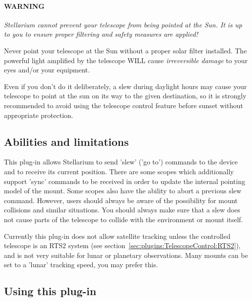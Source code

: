 \paragraph{WARNING}\emph{Stellarium cannot prevent your
telescope from being pointed at the Sun. It is up to you to ensure
proper filtering and safety measures are applied!}

Never point your telescope at the Sun without a proper solar filter
installed. The powerful light amplified by the telescope WILL cause
\emph{irreversible damage} to your eyes and/or your equipment.

Even if you don't do it deliberately, a slew during daylight hours may
cause your telescope to point at the sun on its way to the given
destination, so it is strongly recommended to avoid using the
telescope control feature before sunset without appropriate
protection.



\subsection{Abilities and limitations}
\label{sec:plugins:TelescopeControl:Limitations}

This plug-in allows Stellarium to send 'slew' ('go to') commands
to the device and to receive its current position. There are some scopes which
additionally support 'sync' commands to be received in order to update the internal
pointing model of the mount. Some scopes also have the ability to abort a previous 
slew command. However, users should always be aware of the possibility for mount 
collisions and similar situations. You should always make sure that a slew does 
not cause parts of the telescope to collide with the environment or mount itself. 

Currently this plug-in does not allow satellite tracking unless the controlled 
telescope is an RTS2 system (see section~\ref{sec:plugins:TelescopeControl:RTS2}), 
and is not very suitable for lunar or planetary observations. 
Many mounts can be set to a 'lunar' tracking speed, you may prefer this. 

\subsection{Using this plug-in}
\label{sec:plugins:TelescopeControl:using}


